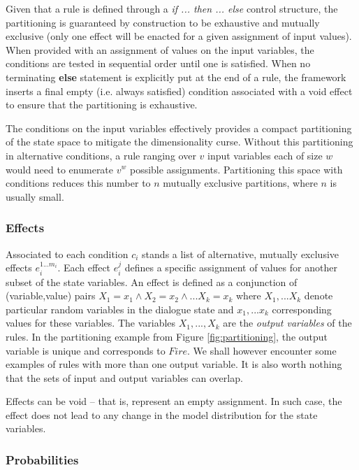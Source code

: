 Given that a rule is defined through a \textit{if ... then ... else} control structure, the partitioning is guaranteed by construction to be exhaustive and mutually exclusive (only one effect will be enacted for a given assignment of input values).  When provided with an assignment of values on the input variables, the conditions are tested in sequential order until one is satisfied. When no terminating \textbf{else} statement is explicitly put at the end of a rule, the framework inserts a final empty (i.e. always satisfied) condition associated with a void effect to ensure that the partitioning is exhaustive. 

The conditions on the input variables effectively provides a compact partitioning of the state space to mitigate the dimensionality curse.  Without this partitioning in alternative conditions, a rule ranging over $v$ input variables each of size $w$ would need to enumerate $v^w$ possible assignments.  Partitioning this space with conditions reduces this number to $n$ mutually exclusive partitions, where $n$ is usually small. 


\subsubsection*{Effects}

Associated to each condition $c_i$ stands a list of alternative, mutually exclusive effects $e_i^{1...m_i}$. Each effect $e_i^j$ defines a specific assignment of values for another subset of the state variables.  An effect is defined as a conjunction of (variable,value) pairs $X_1\!=\!x_1 \land X_2\!=\!x_2 \land ... X_k\!=\!x_k$ where $X_1,... X_k$ denote particular random variables in the dialogue state and $x_1,...x_k$ corresponding values for these variables.   The variables $X_1,...,X_k$ are the \textit{output variables} of the rules. In the partitioning example from Figure \ref{fig:partitioning}, the output variable is unique and corresponds to $Fire$. We shall however encounter some examples of rules with more than one output variable. It is also worth nothing that the sets of input and output variables can overlap.

Effects can be void -- that is, represent an empty assignment.  In such case, the effect does not lead to any change in the model distribution for the state variables. 

\subsubsection*{Probabilities}


